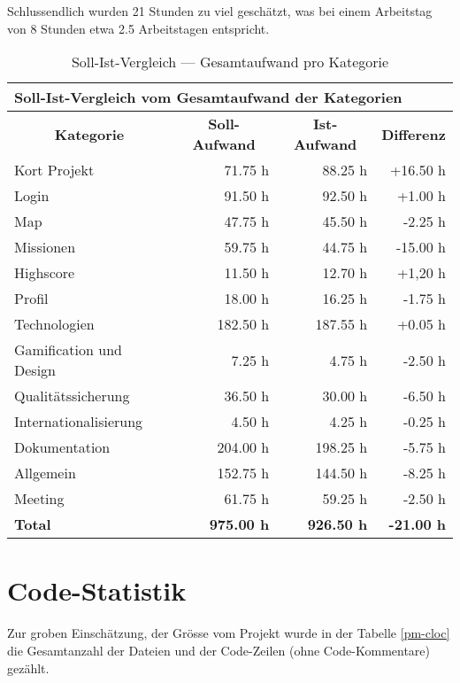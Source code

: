Schlussendlich wurden 21 Stunden zu viel geschätzt, was bei einem Arbeitstag von 8 Stunden etwa 2.5 Arbeitstagen entspricht. 


\begin{table}[H]
\centering
\label{pm-arbeitsaufwand-kategorie-ges}
\begin{tabular}{|l|r|r|r|}
\hline
\multicolumn{4}{|l|}{\textbf{Soll-Ist-Vergleich vom Gesamtaufwand der Kategorien}} \\
\hline
\multicolumn{1}{|c|}{\textbf{Kategorie}} & \multicolumn{1}{|c|}{\textbf{Soll-Aufwand}} & \multicolumn{1}{|c|}{\textbf{Ist-Aufwand}} & \multicolumn{1}{|c|}{\textbf{Differenz}}\\
\hline
Kort Projekt & 71.75 h & 88.25 h & +16.50 h \\
\hline
Login & 91.50 h & 92.50 h & +1.00 h \\
\hline
Map & 47.75	h & 45.50 h & -2.25 h \\
\hline
Missionen & 59.75 h & 44.75 h & -15.00 h \\
\hline
Highscore & 11.50 h & 12.70 h & +1,20 h \\
\hline
Profil & 18.00 h & 16.25 h & -1.75 h \\
\hline
Technologien & 182.50 h & 187.55 h & +0.05 h \\
\hline
Gamification und Design & 7.25 h & 4.75 h & -2.50 h \\
\hline
Qualitätssicherung & 36.50 h & 30.00 h & -6.50 h \\
\hline
Internationalisierung & 4.50 h & 4.25 h & -0.25 h \\
\hline
Dokumentation & 204.00 h & 198.25 h & -5.75 h \\
\hline
Allgemein & 152.75 h & 144.50 h & -8.25 h \\
\hline
Meeting & 61.75 h & 59.25 h & -2.50 h \\
\hline
\textbf{Total} & \textbf{975.00 h} & \textbf{926.50 h} & \textbf{-21.00 h} \\
\hline
\end{tabular}
\caption{Soll-Ist-Vergleich --- Gesamtaufwand pro Kategorie}
\end{table}

\section{Code-Statistik}

Zur groben Einschätzung, der Grösse vom Projekt wurde in der Tabelle \ref{pm-cloc} die Gesamtanzahl der Dateien und der Code-Zeilen (ohne Code-Kommentare) gezählt.

